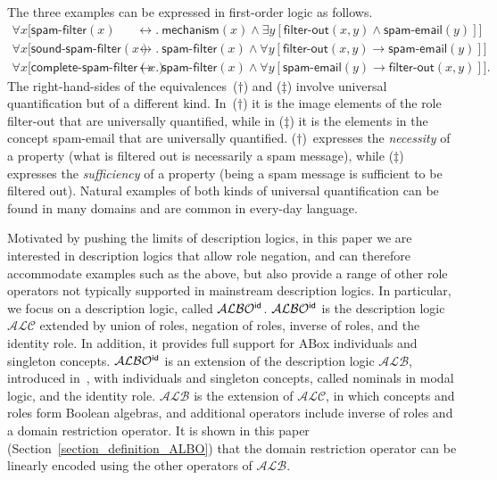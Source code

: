 \documentclass[leqno
,pdflatex
,prodmode
,acmtocl
]{acmsmall}
\newcommand{\mathcmd}[1]{\ensuremath{#1}\xspace}
\newcommand{\dlfont}{\mathcal}
\newcommand{\dl}[1]{\mathcmd{\dlfont{#1}}}
\newcommand{\idRole}{\mathcmd{\textsf{\upshape\mdseries id}}}
\newcommand{\ALBOid}{\dl{ALBO\smash[t]{\mbox{${}^{\idRole}$}}}}
\newcommand{\ALC}{\dl{ALC}}
\newcommand{\ALB}{\dl{ALB}}
\begin{document}
The three examples can be expressed in first-order logic as follows.
\begin{align*}
\forall x [\textsf{spam-filter}(x) & \leftrightarrow .\
\textsf{mechanism}(x) \land \exists y [ \textsf{filter-out}(x,y)
\land \textsf{spam-email}(y)]]
\\
\tag{$\dagger$} 
\forall x [\textsf{sound-spam-filter}(x) & \leftrightarrow .\
\textsf{spam-filter}(x) \land \forall y [ \textsf{filter-out}(x,y) 
\rightarrow \textsf{spam-email}(y)]]
\\
\tag{$\ddagger$}
\forall x [\textsf{complete-spam-filter}(x) & \leftrightarrow .\
\textsf{spam-filter}(x) \land \forall y [ \textsf{spam-email}(y) 
\rightarrow  \textsf{filter-out}(x,y)]].
\end{align*} 
The right-hand-sides of the equivalences~($\dagger$) and ($\ddagger$) involve
universal quantification but of a different kind.
In~($\dagger$) it is the image elements of the role \textsf{filter-out}
that are universally quantified, while in ($\ddagger$) it is the
elements in the concept \textsf{spam-email} that are universally quantified.
($\dagger$)~expresses the \emph{necessity} of a property (what is
filtered out is necessarily a spam message), while ($\ddagger$)
expresses the \emph{sufficiency} of a property (being a spam message
is sufficient to be filtered out).
Natural examples of both kinds of universal quantification can
be found in many domains and are common in every-day language.

Motivated by pushing the limits of description logics, in this paper
we are interested in description logics that
allow role negation, and can therefore accommodate examples such as the
above,
but also provide a range of other role operators not typically
supported in mainstream description logics.
In particular, we focus on a description logic, called \ALBOid.
\ALBOid is the description logic \ALC extended by union
of roles, negation of roles, inverse of roles, and the identity role.
In addition, it provides full support for ABox individuals and singleton
concepts.
\ALBOid is an extension of the description logic
\ALB, introduced in~\cite{HustadtSchmidt00a}, with individuals and singleton concepts,
called nominals in modal logic, and the identity role.
\ALB is the extension of \ALC, in which concepts and roles form
Boolean algebras, and additional operators include inverse of roles
and a domain restriction operator.
It is shown in this paper (Section~\ref{section_definition_ALBO})
that the domain restriction operator
can be linearly encoded using the other operators of \ALB.
\end{document}
